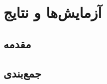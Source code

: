 
\chapter{آزمایش‌ها و نتایج}
\label{ExperimentsResultChapter}



\section{مقدمه}



\section{جمع‌بندی}
